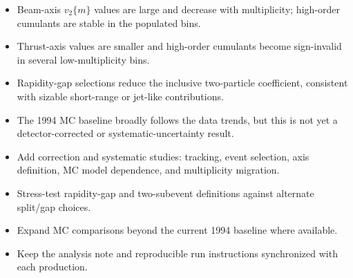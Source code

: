 \documentclass[aspectratio=169,10pt]{beamer}
\newcommand{\slidehead}[1]{%
  \begin{center}\vspace{-0.2em}{\Large\bfseries #1}\end{center}\vspace{0.3em}
}
\begin{document}
\begin{frame}
\slidehead{What We Learn So Far}
\begin{itemize}\setlength\itemsep{0.75em}
  \item Beam-axis \(v_2\{m\}\) values are large and decrease with multiplicity; high-order cumulants are stable in the populated bins.
  \item Thrust-axis values are smaller and high-order cumulants become sign-invalid in several low-multiplicity bins.
  \item Rapidity-gap selections reduce the inclusive two-particle coefficient, consistent with sizable short-range or jet-like contributions.
  \item The 1994 MC baseline broadly follows the data trends, but this is not yet a detector-corrected or systematic-uncertainty result.
\end{itemize}
\end{frame}

\begin{frame}
\slidehead{Next Steps}
\begin{itemize}\setlength\itemsep{0.65em}
  \item Add correction and systematic studies: tracking, event selection, axis definition, MC model dependence, and multiplicity migration.
  \item Stress-test rapidity-gap and two-subevent definitions against alternate split/gap choices.
  \item Expand MC comparisons beyond the current 1994 baseline where available.
  \item Keep the analysis note and reproducible run instructions synchronized with each production.
\end{itemize}
\vspace{0.5em}
\end{frame}
\end{document}
